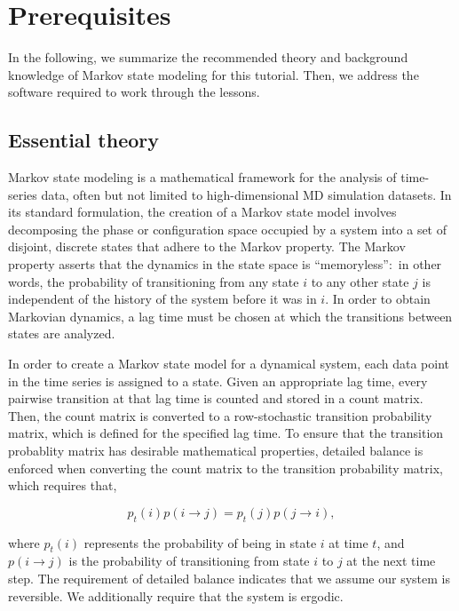 \documentclass[9pt,tutorial]{livecoms}
\begin{document}
\section{Prerequisites}

In the following, we summarize the recommended theory and background knowledge of Markov state modeling for this tutorial.
Then, we address the software required to work through the lessons.

\subsection{Essential theory}
\label{sec:theory}

Markov state modeling is a mathematical framework for the analysis of time-series data, often but not limited to high-dimensional MD simulation datasets.
In its standard formulation, the creation of a Markov state model involves decomposing the phase or configuration space occupied by a system into a set of disjoint, discrete states that adhere to the Markov property.
The Markov property asserts that the dynamics in the state space is ``memoryless'':~in other words, the probability of transitioning from any state $i$ to any other state $j$ is independent of the history of the system before it was in $i$.
In order to obtain Markovian dynamics, a lag time must be chosen at which the transitions between states are analyzed.

In order to create a Markov state model for a dynamical system, each data point in the time series is assigned to a state.
Given an appropriate lag time, every pairwise transition at that lag time is counted and stored in a count matrix.
Then, the count matrix is converted to a row-stochastic transition probability matrix, which is defined for the specified lag time.
To ensure that the transition probablity matrix has desirable mathematical properties, detailed balance is enforced when converting the count matrix to the transition probability matrix, which requires that,

\begin{equation}
\label{eq:balance}
p_t(i) p(i \rightarrow j) = p_t(j)p(j \rightarrow i),
\end{equation}

\noindent{}where $p_t(i)$ represents the probability of being in state $i$ at time $t$, and $p(i \rightarrow j)$ is the probability of transitioning from state $i$ to $j$ at the next time step.
The requirement of detailed balance indicates that we assume our system is reversible.
We additionally require that the system is ergodic.
\end{document}
